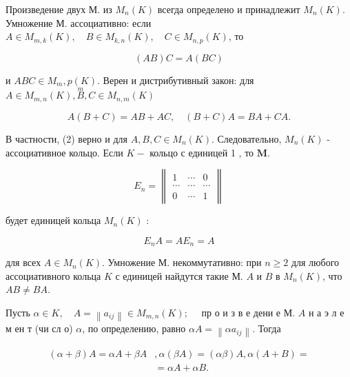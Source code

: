 \documentclass[10pt]{article}
\begin{document}
Произведение двух М. из $M_{n}(K)$ всегда определено и принадлежит $M_{n}(K)$. Умножение М. ассоциативно: если $A \in M_{m, k}(K), \quad B \in M_{k, n}(K), \quad C \in M_{n, p}(K)$, то



\[

(A B) C=A(B C)

\]



и $A B C \in M_{m}, p(K)$. Верен и дистрибутивный закон: для $A \in M_{m, n}(K), \stackrel{m}{B}, C \in M_{n, m}(K)$



\[

A(B+C)=A B+A C, \quad(B+C) A=B A+C A .

\]



В частности, (2) верно и для $A, B, C \in M_{n}(K)$. Следовательно, $M_{n}(K)$ - ассоциативное кольцо. Если $K-$ кольцо с единицей 1 , то $\mathbf{M}$.



\[

E_{n}=\left\|\begin{array}{ccc}

1 & \cdots & 0 \\

\cdots & \cdots & \cdots \\

0 & \cdots & 1

\end{array}\right\|

\]



будет единицей кольца $M_{n}(K)$ :



\[

E_{n} A=A E_{n}=A

\]



для всех $A \in M_{n}(K)$. Умножение М. некоммутативно: при $n \geqslant 2$ для любого ассоциативного кольца $K$ с единицей найдутся такие М. $A$ и $B$ в $M_{n}(K)$, что $A B \neq B A$.



Пусть $\alpha \in K, \quad A=\left\|a_{i j}\right\| \in M_{m, n}(K) ; \quad$ пр о и з в е дени е М. $A$ н а э л е м ен т (чи сл о) $\alpha$, по определению, равно $\alpha A=\left\|\alpha a_{i j}\right\|$. Тогда



\[

\begin{aligned}

(\alpha+\beta) A=\alpha A+\beta A & , \alpha(\beta A)=(\alpha \beta) A, \alpha(A+B)= \\

& =\alpha A+\alpha B .

\end{aligned}

\]
\end{document}
